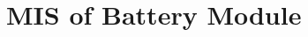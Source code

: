 \documentclass[12pt, titlepage]{article}
\begin{document}
%
%
%
%
%
%
%
%
%
%
%







\section{MIS of Battery Module} \label{mBM} 
\end{document}
